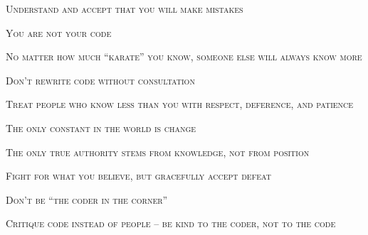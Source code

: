\documentclass{article}
\newcommand{\ssec}[1]{\centering\large\scshape #1\\ \vspace{1.5em}}
\begin{document}
\vspace{5em}

\ssec{Understand and accept that you will make mistakes}

\ssec{You are not your code}

\ssec{No matter how much ``karate'' you know, someone else will always know more}

\ssec{Don't rewrite code without consultation}

\ssec{Treat people who know less than you with respect, deference, and patience}

\ssec{The only constant in the world is change}

\ssec{The only true authority stems from knowledge, not from position}

\ssec{Fight for what you believe, but gracefully accept defeat}

\ssec{Don't be ``the coder in the corner''}

\ssec{Critique code instead of people -- be kind to the coder, not to the code}
\end{document}

